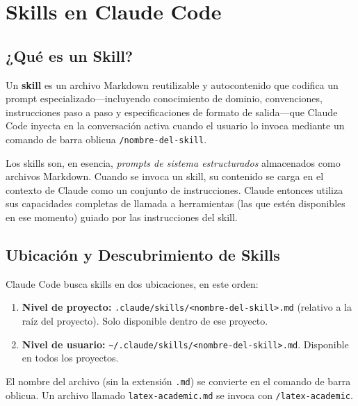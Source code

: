 \documentclass[11pt,letterpaper]{article}
\begin{document}
\section{Skills en Claude Code}

\subsection{¿Qué es un Skill?}

\begin{definitionbox}[title=Skill (Claude Code)]
Un \textbf{skill} es un archivo Markdown reutilizable y autocontenido que codifica un prompt especializado---incluyendo conocimiento de dominio, convenciones, instrucciones paso a paso y especificaciones de formato de salida---que Claude Code inyecta en la conversación activa cuando el usuario lo invoca mediante un comando de barra oblicua \texttt{/nombre-del-skill}.
\end{definitionbox}

Los skills son, en esencia, \emph{prompts de sistema estructurados} almacenados como archivos Markdown. Cuando se invoca un skill, su contenido se carga en el contexto de Claude como un conjunto de instrucciones. Claude entonces utiliza sus capacidades completas de llamada a herramientas (las que estén disponibles en ese momento) guiado por las instrucciones del skill.

\subsection{Ubicación y Descubrimiento de Skills}

Claude Code busca skills en dos ubicaciones, en este orden:

\begin{enumerate}[leftmargin=*]
    \item \textbf{Nivel de proyecto:} \texttt{.claude/skills/<nombre-del-skill>.md} (relativo a la raíz del proyecto). Solo disponible dentro de ese proyecto.
    \item \textbf{Nivel de usuario:} \texttt{\textasciitilde/.claude/skills/<nombre-del-skill>.md}. Disponible en todos los proyectos.
\end{enumerate}

El nombre del archivo (sin la extensión \texttt{.md}) se convierte en el comando de barra oblicua. Un archivo llamado \texttt{latex-academic.md} se invoca con \texttt{/latex-academic}.
\end{document}
